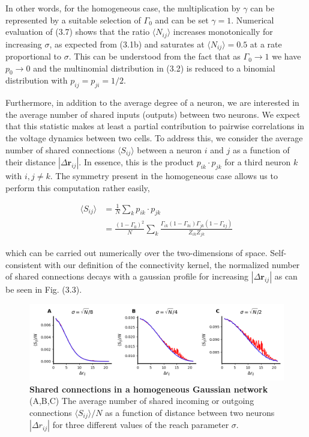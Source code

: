 \documentclass{ucetd}
\begin{document}
In other words, for the homogeneous case, the multiplication by $\gamma$ can be represented by a suitable selection of $\Gamma_{0}$ and can be set $\gamma=1$. Numerical evaluation of (3.7) shows that the ratio $\langle N_{ij}\rangle$ increases monotonically for increasing $\sigma$, as expected from (3.1b) and saturates at $\langle N_{ij}\rangle = 0.5$ at a rate proportional to $\sigma$. This can be understood from the fact that as $\Gamma_{0} \rightarrow 1$ we have $p_{0} \rightarrow 0$ and the multinomial distribution in (3.2) is reduced to a binomial distribution with $p_{ij} = p_{ji} = 1/2$. 

Furthermore, in addition to the average degree of a neuron, we are interested in the average number of shared inputs (outputs) between two neurons. We expect that this statistic makes at least a partial contribution to pairwise correlations in the voltage dynamics between two cells. To address this, we consider the average number of shared connections $\langle S_{ij} \rangle$ between a neuron $i$ and $j$ as a function of their distance $|\Delta \mathbf{r}_{ij}|$. In essence, this is the product $p_{ik}\cdot p_{jk}$ for a third neuron $k$ with $i,j\neq k$. The symmetry present in the homogeneous case allows us to perform this computation rather easily,

\begin{align}
\langle S_{ij} \rangle &= \frac{1}{N}\sum_{k} p_{ik}\cdot p_{jk} \\
&= \frac{\left(1-\Gamma_{0}\right)^{2}}{N}\sum_{k}\frac{\Gamma_{ik}(1-\Gamma_{ki})\Gamma_{jk}(1-\Gamma_{kj})}{Z_{ik}Z_{jk}}
\end{align}


which can be carried out numerically over the two-dimensions of space. Self-consistent with our definition of the connectivity kernel, the normalized number of shared connections decays with a gaussian profile for increasing $|\Delta \mathbf{r}_{ij}|$ as can be seen in Fig. (3.3).
\begin{figure}
\centering
\includegraphics[width=175mm]{fig_9}
\caption{\textbf{Shared connections in a homogeneous Gaussian network} (A,B,C) The average number of shared incoming or outgoing connections $\langle S_{ij}\rangle /N$ as a function of distance between two neurons $|\Delta r_{ij}|$ for three different values of the reach parameter $\sigma$.}
\end{figure}
\end{document}
